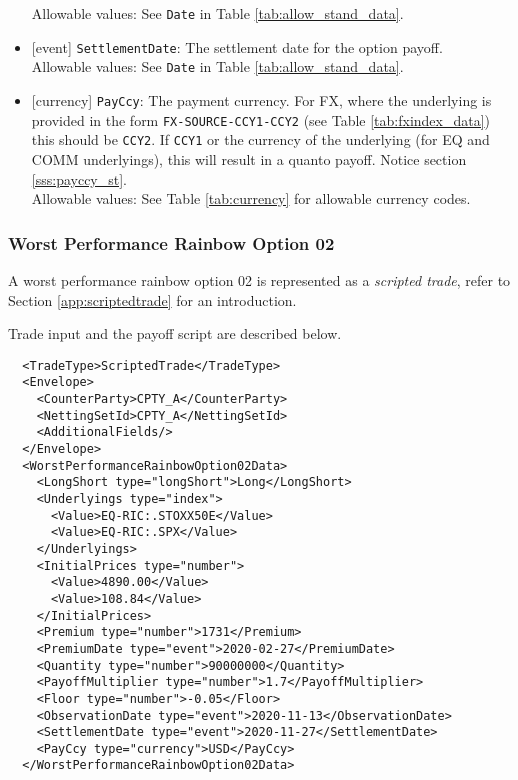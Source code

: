 \begin{itemize}
  Allowable values: See \lstinline!Date! in Table \ref{tab:allow_stand_data}.
  \item{}[event] \lstinline!SettlementDate!: The settlement date for the option payoff. \\
  Allowable values: See \lstinline!Date! in Table \ref{tab:allow_stand_data}.
  \item{}[currency] \lstinline!PayCcy!: The payment currency. For FX, where the underlying is provided
      in the form \lstinline!FX-SOURCE-CCY1-CCY2! (see Table \ref{tab:fxindex_data}) this should
      be \lstinline!CCY2!. If \lstinline!CCY1! or the currency of the underlying (for EQ and
      COMM underlyings), this will result in a quanto payoff. Notice section \ref{sss:payccy_st}. \\
        Allowable values: See Table \ref{tab:currency} for allowable currency codes.
\end{itemize}

\subsubsection*{Worst Performance Rainbow Option 02}

A worst performance rainbow option 02 is represented as a {\em scripted trade}, refer to
Section \ref{app:scriptedtrade} for an introduction.

Trade input and the payoff script are described below.

\begin{verbatim}
  <TradeType>ScriptedTrade</TradeType>
  <Envelope>
    <CounterParty>CPTY_A</CounterParty>
    <NettingSetId>CPTY_A</NettingSetId>
    <AdditionalFields/>
  </Envelope>
  <WorstPerformanceRainbowOption02Data>
    <LongShort type="longShort">Long</LongShort>
    <Underlyings type="index">
      <Value>EQ-RIC:.STOXX50E</Value>
      <Value>EQ-RIC:.SPX</Value>
    </Underlyings>
    <InitialPrices type="number">
      <Value>4890.00</Value>
      <Value>108.84</Value>
    </InitialPrices>
    <Premium type="number">1731</Premium>
    <PremiumDate type="event">2020-02-27</PremiumDate>
    <Quantity type="number">90000000</Quantity>
    <PayoffMultiplier type="number">1.7</PayoffMultiplier>
    <Floor type="number">-0.05</Floor>
    <ObservationDate type="event">2020-11-13</ObservationDate>
    <SettlementDate type="event">2020-11-27</SettlementDate>
    <PayCcy type="currency">USD</PayCcy>
  </WorstPerformanceRainbowOption02Data>
\end{verbatim}


